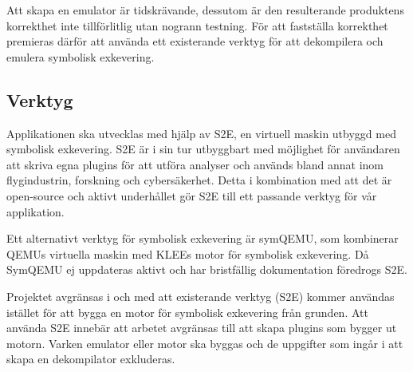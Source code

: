 






Att skapa en emulator är tidskrävande, dessutom är den resulterande 
produktens korrekthet inte tillförlitlig utan nogrann testning. För att 
fastställa korrekthet premieras därför att använda ett existerande verktyg 
för att dekompilera och emulera symbolisk exkevering. 

\subsection{Verktyg} 

Applikationen ska utvecklas med hjälp av S2E, en virtuell maskin utbyggd med 
symbolisk exkevering. S2E är i sin tur utbyggbart med möjlighet för användaren 
att skriva egna plugins för att utföra analyser och används bland annat inom 
flygindustrin, forskning och cybersäkerhet. Detta i kombination med att det 
är open-source och aktivt underhållet gör S2E till ett passande verktyg för 
vår applikation. 

Ett alternativt verktyg för symbolisk exkevering är symQEMU, som kombinerar 
QEMUs virtuella maskin med KLEEs motor för symbolisk exkevering. Då SymQEMU 
ej uppdateras aktivt och har bristfällig dokumentation föredrogs S2E. 

Projektet avgränsas i och med att existerande verktyg (S2E) kommer användas 
istället för att bygga en motor för symbolisk exkevering från grunden. 
Att använda S2E innebär att arbetet avgränsas till att skapa plugins som 
bygger ut motorn. Varken emulator eller motor ska byggas och de uppgifter 
som ingår i att skapa en dekompilator exkluderas. 

